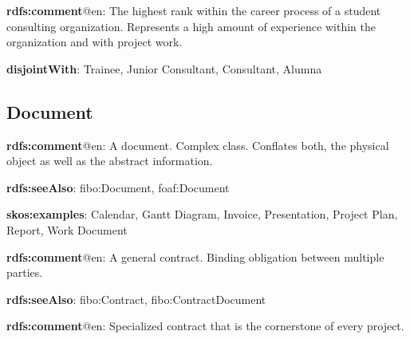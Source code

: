 \documentclass[a4paper, DIV=13, BCOR=0cm]{scrbook}
\begin{document}
\begin{mdframed}[style=onto-3, frametitle={Senior Consultant}]
	{%
		\begin{compactitem}
			\item \textbf{rdfs:comment}@en: The highest rank within the career 
			process of a student consulting organization. Represents a high 
			amount of experience within the organization and with project work.
			\item \textbf{disjointWith}: Trainee, Junior Consultant, Consultant, 
			Alumna
		\end{compactitem}
	} %
\end{mdframed}

\subsection{Document}
\begin{mdframed}[style=onto, frametitle={Document}]
	{%
		\begin{compactitem}
			\item \textbf{rdfs:comment}@en: A document. Complex class. Conflates both, the physical object as well as the abstract information.
			\item \textbf{rdfs:seeAlso}: fibo:Document, foaf:Document
			\item \textbf{skos:examples}: Calendar, Gantt Diagram, Invoice, Presentation, Project Plan, Report, Work Document
		\end{compactitem}
	} %
\end{mdframed}

\begin{mdframed}[style=onto-1, frametitle={Contract}]
	{%
		\begin{compactitem}
			\item \textbf{rdfs:comment}@en: A general contract. Binding obligation between multiple parties.
			\item \textbf{rdfs:seeAlso}: fibo:Contract, fibo:ContractDocument
		\end{compactitem}
	} %
\end{mdframed}

\begin{mdframed}[style=onto-2, frametitle={Project Contract}]
	{%
		\begin{compactitem}
			\item \textbf{rdfs:comment}@en: Specialized contract that is the cornerstone of every project.
		\end{compactitem}
	} %
\end{mdframed}
\end{document}
